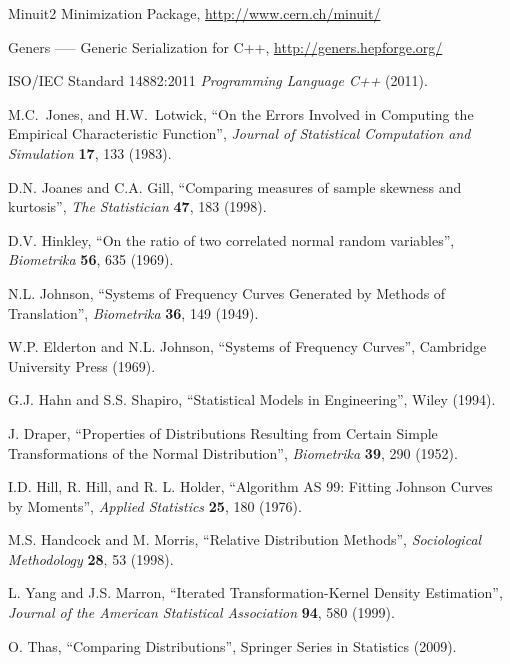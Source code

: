 \documentclass[12pt,titlepage]{article}
\begin{document}
\cleardoublepage
{}
{}
\begin{thebibliography}{99}

Minuit2 Minimization Package,
\href{http://www.cern.ch/minuit/}{http://www.cern.ch/minuit/}

Geners —-- Generic Serialization for C++,
\href{http://geners.hepforge.org/}{http://geners.hepforge.org/}

 ISO/IEC Standard 14882:2011
{\it Programming Language C++} (2011).

M.C.~Jones, and H.W.~Lotwick,  ``On the Errors Involved in Computing the Empirical Characteristic Function'', {\it Journal of Statistical Computation and Simulation} {\bf 17}, 133 (1983).

D.N. Joanes and C.A. Gill, ``Comparing measures of sample skewness
and kurtosis'', {\it The Statistician} {\bf 47}, 183 (1998).

D.V. Hinkley, ``On the ratio of two correlated normal random variables'',
{\it Biometrika} {\bf 56}, 635 (1969).

N.L. Johnson, ``Systems of Frequency Curves Generated by Methods of Translation'', {\it Biometrika} {\bf 36}, 149 (1949).

W.P. Elderton and N.L. Johnson, ``Systems of Frequency Curves'',
Cambridge University Press (1969).

G.J. Hahn and S.S. Shapiro, ``Statistical Models in Engineering'',
Wiley (1994).

J. Draper, ``Properties of Distributions Resulting from Certain Simple Transformations of the Normal Distribution'', {\it Biometrika} {\bf 39}, 290 (1952).

I.D. Hill, R. Hill, and R. L. Holder,
``Algorithm AS 99: Fitting Johnson Curves by Moments'',
{\it Applied Statistics} {\bf 25}, 180 (1976).

M.S. Handcock and M. Morris, ``Relative Distribution Methods'',
{\it Sociological Methodology} {\bf 28}, 53 (1998).

L. Yang and J.S. Marron, ``Iterated Transformation-Kernel Density Estimation'',
{\it Journal of the American Statistical Association} {\bf 94}, 580 (1999).

O. Thas, ``Comparing Distributions'', Springer Series in Statistics (2009).


\end{thebibliography}
\end{document}

